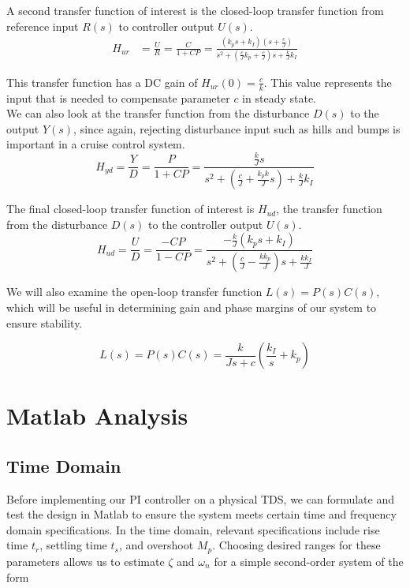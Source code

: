 \documentclass[11pt,titlepage]{article}
\begin{document}
	\noindent A second transfer function of interest is the closed-loop transfer function from reference input $R(s)$ to controller output $U(s)$.
	\begin{align}
		H_{ur}&=\frac{U}{R}=\frac{C}{1+CP}=\frac{(k_ps+k_I)(s+\frac{c}{J})}{s^2+(\frac{c}{J}k_p+\frac{c}{J})s+\frac{k}{J}k_I}
	\end{align}
	
	\noindent This transfer function has a DC gain of  $H_{ur}(0)=\frac{c}{k}$. This value represents the input that is needed to compensate parameter $c$ in steady state. \\
		
	\noindent We can also look at the transfer function from the disturbance $D(s)$ to the output $Y(s)$, since again, rejecting disturbance input such as hills and bumps is important in a cruise control system.
	\begin{equation}
		H_{yd}=\frac{Y}{D}=\frac{P}{1+CP}=\frac{\frac{k}{J}s}{s^2+(\frac{c}{J}+\frac{k_pk}{J}s)+\frac{k}{J}k_I}
	\end{equation}
	
	\noindent The final closed-loop transfer function of interest is $H_{ud}$, the transfer function from the disturbance $D(s)$ to the controller output $U(s)$. 
	\begin{equation}
		H_{ud}=\frac{U}{D}=\frac{-CP}{1-CP}=\frac{-\frac{k}{J}(k_ps+k_I)}{s^2+(\frac{c}{J}-\frac{kk_p}{J})s+\frac{kk_I}{J}}
	\end{equation}	
		
	\noindent We will also examine the open-loop transfer function $L(s)=P(s)C(s)$, which will be useful in determining gain and phase margins of our system to ensure stability.
	
	\begin{equation}
		L(s)=P(s)C(s)=	\frac{k}{Js+c}(\frac{k_I}{s}+k_p)
		\end{equation}


\section{Matlab Analysis}\label{sec:mat_anys}
    \subsection{Time Domain}
	    Before implementing our PI controller on a physical TDS, we can formulate and test the design in Matlab to ensure the system meets certain time and frequency domain specifications. In the time domain, relevant specifications include rise time $t_r$, settling time $t_s$, and overshoot $M_p$. Choosing desired ranges for these parameters allows us to estimate $\zeta$ and $\omega_{n}$ for a simple second-order system of the form
	    
\end{document}
